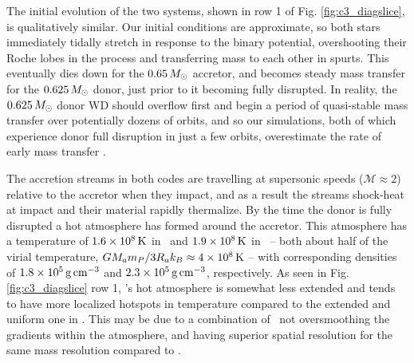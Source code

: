 The initial evolution of the two systems, shown in row 1 of Fig. \ref{fig:c3_diagslice}, is qualitatively similar.  Our initial conditions are approximate, so both stars immediately tidally stretch in response to the binary potential, overshooting their Roche lobes in the process and transferring mass to each other in spurts.  This eventually dies down for the $0.65\,\Msun$ accretor, and becomes steady mass transfer for the $0.625\,\Msun$ donor, just prior to it becoming fully disrupted.  In reality, the $0.625\,\Msun$ donor WD should overflow first and begin a period of quasi-stable mass transfer over potentially dozens of orbits, and so our simulations, both of which experience donor full disruption in just a few orbits, overestimate the rate of early mass transfer \citep{dan+11}.


The accretion streams in both codes are travelling at supersonic speeds ($\mathcal{M} \approx 2$) relative to the accretor when they impact, and as a result the streams shock-heat at impact and their material rapidly thermalize.  By the time the donor is fully disrupted a hot atmosphere has formed around the accretor.  This atmosphere has a temperature of $1.6 \times 10^8\,\mathrm{K}$ in  \arepo\ and $1.9\times 10^8\,\mathrm{K}$ in \gasoline\ -- both about half of the virial temperature, $GM_am_P/3R_ak_B \approx 4 \times 10^8\,\mathrm{K}$ -- with corresponding densities of $1.8\times10^5\,\gcc$ and $2.3\times10^5\,\gcc$, respectively.  As seen in Fig. \ref{fig:c3_diagslice} row 1, \arepo's hot atmosphere is somewhat less extended and tends to have more localized hotspots in temperature compared to the extended and uniform one in \gasoline.  This may be due to a combination of \arepo\ not oversmoothing the gradients within the atmosphere, and having superior spatial resolution for the same mass resolution compared to \gasoline.



